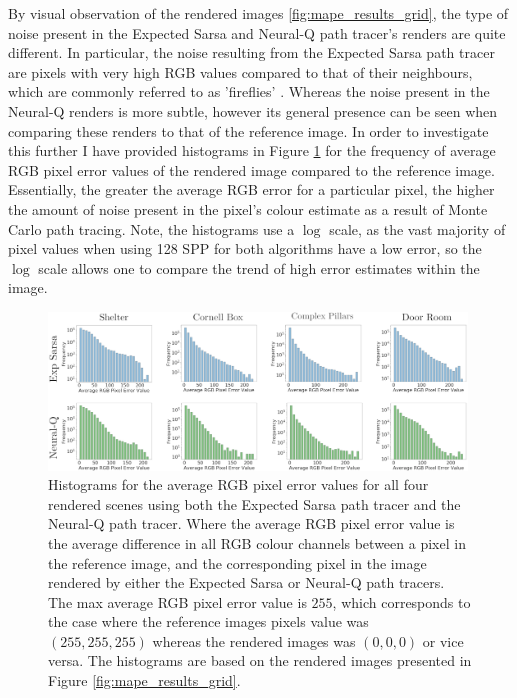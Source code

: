 \documentclass[../dissertation.tex]{subfiles}
\begin{document}
By visual observation of the rendered images \ref{fig:mape_results_grid}, the type of noise present in the Expected Sarsa and Neural-Q path tracer's renders are quite different. In particular, the noise resulting from the Expected Sarsa path tracer are pixels with very high RGB values compared to that of their neighbours, which are commonly referred to as 'fireflies'  \cite{christensen2016path}. Whereas the noise present in the Neural-Q renders is more subtle, however its general presence can be seen when comparing these renders to that of the reference image. In order to investigate this further I have provided histograms in Figure \ref{fig:histogram_errors} for the frequency of average RGB pixel error values of the rendered image compared to the reference image. Essentially, the greater the average RGB error for a particular pixel, the higher the amount of noise present in the pixel's colour estimate as a result of Monte Carlo path tracing. Note, the histograms use a $\log$ scale, as the vast majority of pixel values when using 128 SPP for both algorithms have a low error, so the $\log$ scale allows one to compare the trend of high error estimates within the image. 

\begin{figure}[h]
\begin{center}
\includegraphics[width=0.99\textwidth]{images/noise_diff.png}    
\end{center}
\caption{Histograms for the average RGB pixel error values for all four rendered scenes using both the Expected Sarsa path tracer and the Neural-Q path tracer. Where the average RGB pixel error value is the average difference in all RGB colour channels between a pixel in the reference image, and the corresponding pixel in the image rendered by either the Expected Sarsa or Neural-Q path tracers. The max average RGB pixel error value is $255$, which corresponds to the case where the reference images pixels value was $(255,255,255)$ whereas the rendered images was $(0,0,0)$ or vice versa. The histograms are based on the rendered images presented in Figure \ref{fig:mape_results_grid}.}
\label{fig:histogram_errors}
\end{figure}
\end{document}
